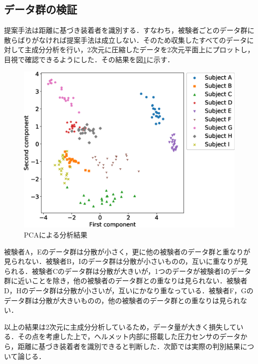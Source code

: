 \documentclass[Japanese]{dicomopapers}
\begin{document}
\subsection{データ群の検証}
提案手法は距離に基づき装着者を識別する．すなわち，被験者ごとのデータ群に散らばりがなければ提案手法は成立しない．そのため収集したすべてのデータに対して主成分分析を行い，2次元に圧縮したデータを2次元平面上にプロットし，目視で確認できるようにした．その結果を図\ref{PCA}に示す．\par

\begin{figure}[!t]
  \begin{center}
    \includegraphics[width=1\linewidth]{figure/PCA.eps}
  \end{center}
  \caption{PCAによる分析結果}
  \label{PCA}
\end{figure}

被験者A，Eのデータ群は分散が小さく，更に他の被験者のデータ群と重なりが見られない．被験者B，Iのデータ群は分散が小さいものの，互いに重なりが見られる．被験者Cのデータ群は分散が大きいが，1つのデータが被験者Iのデータ群に近いことを除き，他の被験者のデータ群との重なりは見られない．被験者D，Hのデータ群は分散が小さいが，互いにかなり重なっている．被験者F，Gのデータ群は分散が大きいものの，他の被験者のデータ群との重なりは見られない．\par
以上の結果は2次元に主成分分析しているため，データ量が大きく損失している．その点を考慮した上で，ヘルメット内部に搭載した圧力センサのデータから，距離に基づき装着者を識別できると判断した．次節では実際の判別結果について論じる．
\end{document}

